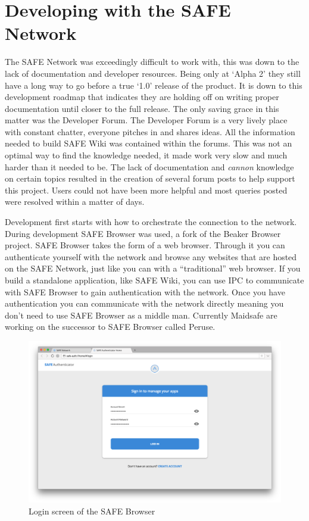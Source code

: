 \section{Developing with the SAFE Network}

The SAFE Network was exceedingly difficult to work with, this was down to the lack of documentation and developer resources. Being only at `Alpha 2' they still have a long way to go before a true `1.0' release of the product. It is down to this development roadmap that indicates they are holding off on writing proper documentation until closer to the full release. The only saving grace in this matter was the Developer Forum. The Developer Forum is a very lively place with constant chatter, everyone pitches in and shares ideas. All the information needed to build SAFE Wiki was contained within the forums. This was not an optimal way to find the knowledge needed, it made work very slow and much harder than it needed to be. The lack of documentation and \textit{cannon} knowledge on certain topics resulted in the creation of several forum posts to help support this project. Users could not have been more helpful and most queries posted were resolved within a matter of days.

Development first starts with how to orchestrate the connection to the network. During development SAFE Browser was used, a fork of the Beaker Browser project. SAFE Browser takes the form of a web browser. Through it you can authenticate yourself with the network and browse any websites that are hosted on the SAFE Network, just like you can with a ``traditional'' web browser. If you build a standalone application, like SAFE Wiki, you can use IPC to communicate with SAFE Browser to gain authentication with the network. Once you have authentication you can communicate with the network directly meaning you don't need to use SAFE Browser as a middle man. Currently Maidsafe are working on the successor to SAFE Browser called Peruse. 

\begin{figure}[h]
	\begin{center}
		\includegraphics[width=\textwidth]{images/safe-browser-login}
		\caption{Login screen of the SAFE Browser}
		\label{fig:safe-browser-login}
	\end{center}
\end{figure}

